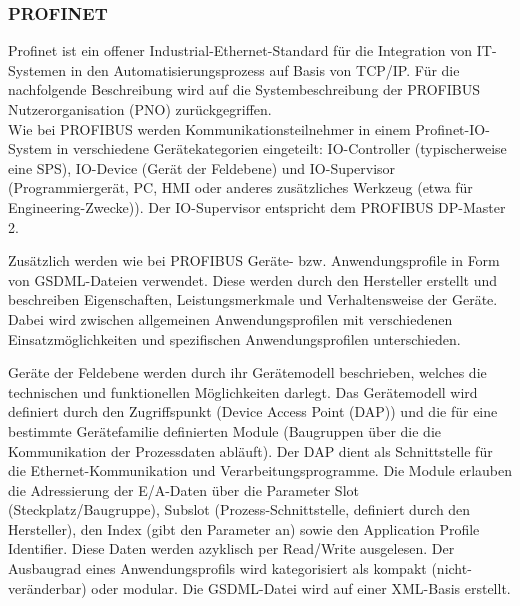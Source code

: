 
\subsubsection{PROFINET}
Profinet ist ein offener Industrial-Ethernet-Standard für die Integration  von IT-Systemen in den Automatisierungsprozess auf Basis von TCP/IP. Für die nachfolgende Beschreibung wird auf die Systembeschreibung der PROFIBUS Nutzerorganisation (PNO)\citep{PROFINET1} zurückgegriffen. \\


Wie bei PROFIBUS werden Kommunikationsteilnehmer in einem Profinet-IO-System in verschiedene Gerätekategorien eingeteilt: IO-Controller (typischerweise eine SPS), IO-Device (Gerät der Feldebene) und IO-Supervisor (Programmiergerät, PC, HMI oder anderes zusätzliches Werkzeug (etwa für Engineering-Zwecke)). Der IO-Supervisor entspricht dem PROFIBUS DP-Master 2. 

Zusätzlich werden wie bei PROFIBUS Geräte- bzw. Anwendungsprofile in Form von GSDML-Dateien verwendet. Diese werden durch den Hersteller erstellt und beschreiben Eigenschaften, Leistungsmerkmale und Verhaltensweise der Geräte. Dabei wird zwischen allgemeinen Anwendungsprofilen mit verschiedenen Einsatzmöglichkeiten und spezifischen Anwendungsprofilen unterschieden. 

Geräte der Feldebene werden durch ihr Gerätemodell beschrieben, welches die technischen und funktionellen Möglichkeiten darlegt. Das Gerätemodell wird definiert durch den Zugriffspunkt (Device Access Point (DAP)) und die für eine bestimmte Gerätefamilie definierten Module (Baugruppen über die die Kommunikation der Prozessdaten abläuft). Der DAP dient als Schnittstelle für die Ethernet-Kommunikation und Verarbeitungsprogramme. Die Module erlauben die Adressierung der E/A-Daten über die Parameter Slot (Steckplatz/Baugruppe), Subslot (Prozess-Schnittstelle, definiert durch den Hersteller), den Index (gibt den Parameter an) sowie den Application Profile Identifier. Diese Daten werden azyklisch per Read/Write ausgelesen.
Der Ausbaugrad eines Anwendungsprofils wird kategorisiert als \glqq kompakt\grqq{}  (nicht-veränderbar) oder \glqq modular\grqq . Die GSDML-Datei wird auf einer XML-Basis erstellt.\\


